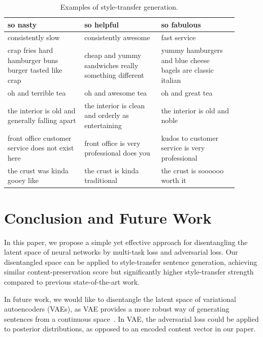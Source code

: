\documentclass[11pt,a4paper]{article}
\begin{document}
\begin{table}[!ht]
\begin{tabular}{| p{0.3\linewidth} | p{0.3\linewidth} | p{0.3\linewidth} |}
		\hline
		\hline
		so nasty                                               & so helpful                                                     & so fabulous                                                 \\
		\hline
		consistently slow                                      & consistently awesome                                           & fast service                                                \\
		\hline
		crap fries hard hamburger buns burger tasted like crap & cheap and yummy sandwiches really something different          & yummy hamburgers and blue cheese bagels are classic italian \\
		\hline
		oh and terrible tea                                    & oh and awesome tea                                             & oh and great tea                                            \\
		\hline
		the interior is old and generally falling apart        & the interior is clean and orderly as entertaining              & the interior is old and noble                               \\
		\hline
		front office customer service does not exist here      & front office is very professional does you                     & kudos to customer service is very professional              \\
		\hline
		the crust was kinda gooey like                         & the crust is kinda traditional                                 & the crust is soooooo worth it                               \\
		\hline
	\end{tabular}
	\caption{Examples of style-transfer generation.}
	\label{tab:transfer-samples}
\end{table}

\section{Conclusion and Future Work}
In this paper, we propose a simple yet effective approach for disentangling the latent space of neural networks by multi-task loss and adversarial loss. Our disentangled space can be applied to style-transfer sentence generation, achieving similar content-preservation score but significantly higher style-transfer strength compared to previous state-of-the-art work.

In future work, we would like to disentangle the latent space of variational autoencoders (VAEs), as VAE provides a more robust way of generating sentences from a continuous space~\cite{bowman2016generating}. In VAE, the adversarial loss could be applied to posterior distributions, as opposed to an encoded content vector in our paper.



\end{document}
